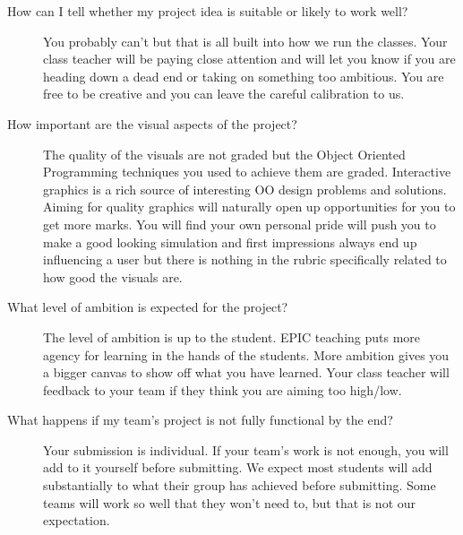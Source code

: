 \documentclass[twoside=false,DIV=14]{scrartcl}
\begin{document}
\begin{description}
  \item[How can I tell whether my project idea is suitable or likely to work well?]  You probably can't but that is all built into how we run the classes.  Your class teacher will be paying close attention and will let you know if you are heading down a dead end or taking on something too ambitious.  You are free to be creative and you can leave the careful calibration to us.
  \item[How important are the visual aspects of the project?]  The quality of the visuals are not graded but the Object Oriented Programming techniques you used to achieve them are graded. Interactive graphics is a rich source of interesting OO design problems and solutions.  Aiming for quality graphics will naturally open up opportunities for you to get more marks.  You will find your own personal pride will push you to make a good looking simulation and first impressions always end up influencing a user but there is nothing in the rubric specifically related to how good the visuals are.
  \item[What level of ambition is expected for the project?]  The level of ambition is up to the student.  EPIC teaching puts more agency for learning in the hands of the students.  More ambition gives you a bigger canvas to show off what you have learned.  Your class teacher will feedback to your team if they think you are aiming too high/low.
  \item[What happens if my team’s project is not fully functional by the end?]  Your submission is individual.  If your team's work is not enough, you will add to it yourself before submitting.  We expect most students will add substantially to what their group has achieved before submitting.  Some teams will work so well that they won't need to, but that is not our expectation.
\end{description}
\end{document}

